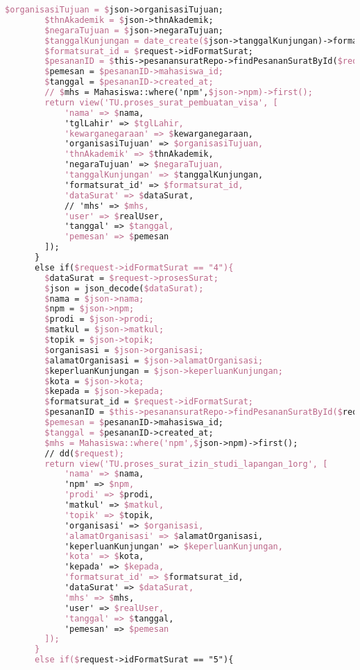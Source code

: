 \begin{lstlisting}[language=tex,basicstyle=\tiny,caption=PesanansuratController.php]
        $organisasiTujuan = $json->organisasiTujuan;
        $thnAkademik = $json->thnAkademik;
        $negaraTujuan = $json->negaraTujuan;
        $tanggalKunjungan = date_create($json->tanggalKunjungan)->format("j F Y");
        $formatsurat_id = $request->idFormatSurat;
        $pesananID = $this->pesanansuratRepo->findPesananSuratById($request->id);
        $pemesan = $pesananID->mahasiswa_id;
        $tanggal = $pesananID->created_at;
        // $mhs = Mahasiswa::where('npm',$json->npm)->first();
        return view('TU.proses_surat_pembuatan_visa', [
            'nama' => $nama,
            'tglLahir' => $tglLahir,
            'kewarganegaraan' => $kewarganegaraan,
            'organisasiTujuan' => $organisasiTujuan,
            'thnAkademik' => $thnAkademik,
            'negaraTujuan' => $negaraTujuan,
            'tanggalKunjungan' => $tanggalKunjungan,
            'formatsurat_id' => $formatsurat_id,
            'dataSurat' => $dataSurat,
            // 'mhs' => $mhs,
            'user' => $realUser,
            'tanggal' => $tanggal,
            'pemesan' => $pemesan
        ]);
      }
      else if($request->idFormatSurat == "4"){
        $dataSurat = $request->prosesSurat;
        $json = json_decode($dataSurat);
        $nama = $json->nama;
        $npm = $json->npm;
        $prodi = $json->prodi;
        $matkul = $json->matkul;
        $topik = $json->topik;
        $organisasi = $json->organisasi;
        $alamatOrganisasi = $json->alamatOrganisasi;
        $keperluanKunjungan = $json->keperluanKunjungan;
        $kota = $json->kota;
        $kepada = $json->kepada;
        $formatsurat_id = $request->idFormatSurat;
        $pesananID = $this->pesanansuratRepo->findPesananSuratById($request->id);
        $pemesan = $pesananID->mahasiswa_id;
        $tanggal = $pesananID->created_at;
        $mhs = Mahasiswa::where('npm',$json->npm)->first();
        // dd($request);
        return view('TU.proses_surat_izin_studi_lapangan_1org', [
            'nama' => $nama,
            'npm' => $npm,
            'prodi' => $prodi,
            'matkul' => $matkul,
            'topik' => $topik,
            'organisasi' => $organisasi,
            'alamatOrganisasi' => $alamatOrganisasi,
            'keperluanKunjungan' => $keperluanKunjungan,
            'kota' => $kota,
            'kepada' => $kepada,
            'formatsurat_id' => $formatsurat_id,
            'dataSurat' => $dataSurat,
            'mhs' => $mhs,
            'user' => $realUser,
            'tanggal' => $tanggal,
            'pemesan' => $pemesan
        ]);
      }
      else if($request->idFormatSurat == "5"){

\end{lstlisting}
